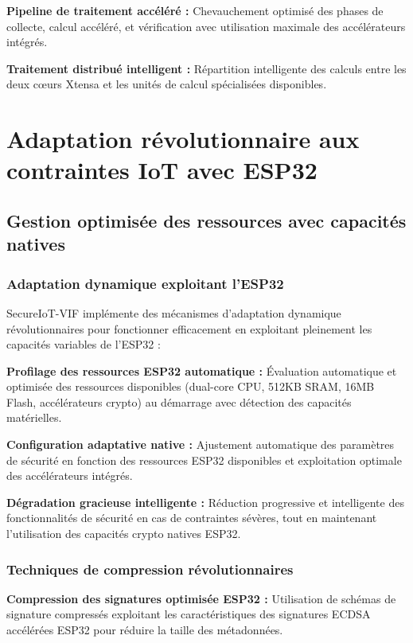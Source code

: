 \begin{algorithm}
\textbf{Pipeline de traitement accéléré :} Chevauchement optimisé des phases de collecte, calcul accéléré, et vérification avec utilisation maximale des accélérateurs intégrés.

\textbf{Traitement distribué intelligent :} Répartition intelligente des calculs entre les deux cœurs Xtensa et les unités de calcul spécialisées disponibles.

\section{Adaptation révolutionnaire aux contraintes IoT avec ESP32}

\subsection{Gestion optimisée des ressources avec capacités natives}

\subsubsection{Adaptation dynamique exploitant l'ESP32}

SecureIoT-VIF implémente des mécanismes d'adaptation dynamique révolutionnaires pour fonctionner efficacement en exploitant pleinement les capacités variables de l'ESP32 :

\textbf{Profilage des ressources ESP32 automatique :} Évaluation automatique et optimisée des ressources disponibles (dual-core CPU, 512KB SRAM, 16MB Flash, accélérateurs crypto) au démarrage avec détection des capacités matérielles.

\textbf{Configuration adaptative native :} Ajustement automatique des paramètres de sécurité en fonction des ressources ESP32 disponibles et exploitation optimale des accélérateurs intégrés.

\textbf{Dégradation gracieuse intelligente :} Réduction progressive et intelligente des fonctionnalités de sécurité en cas de contraintes sévères, tout en maintenant l'utilisation des capacités crypto natives ESP32.

\subsubsection{Techniques de compression révolutionnaires}

\textbf{Compression des signatures optimisée ESP32 :} Utilisation de schémas de signature compressés exploitant les caractéristiques des signatures ECDSA accélérées ESP32 pour réduire la taille des métadonnées.


\end{algorithm}
